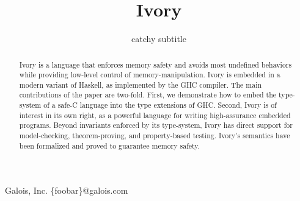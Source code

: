 \documentclass{sigplanconf}
\begin{document}
\setlength{\pdfpageheight}{\paperheight}
\setlength{\pdfpagewidth}{\paperwidth}

\copyrightdata{}
\doi{}



\permissiontopublish             %


\title{Ivory}
\subtitle{catchy subtitle}

           {Galois, Inc.}
           {\{foobar\}@galois.com}

\maketitle

\begin{abstract}
Ivory is a language that enforces memory safety and avoids most undefined
behaviors while providing low-level control of memory-manipulation. Ivory is
embedded in a modern variant of Haskell, as implemented by the GHC compiler. The
main contributions of the paper are two-fold. First, we demonstrate how to
embed the type-system of a safe-C language into the type
extensions of GHC. Second, Ivory is of interest in its own right, as a powerful
language for writing high-assurance embedded programs. Beyond invariants
enforced by its type-system, Ivory has direct support for model-checking,
theorem-proving, and property-based testing. Ivory's semantics have been
formalized and proved to guarantee memory safety.
\end{abstract}


\end{document}
